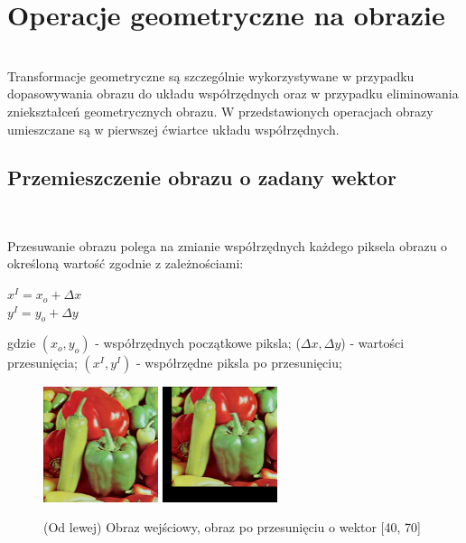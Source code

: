 \documentclass[final,a4paper,openany,12pt]{mwbk}
\begin{document}
\chapter{Operacje geometryczne na obrazie}
\hfill\\
\indent
Transformacje geometryczne są szczególnie wykorzystywane w przypadku dopasowywania obrazu do układu współrzędnych oraz w przypadku eliminowania zniekształceń geometrycznych obrazu. W przedstawionych operacjach obrazy umieszczane są w pierwszej ćwiartce układu współrzędnych.

\section{ Przemieszczenie obrazu o zadany wektor}
\hfill\\
\indent

Przesuwanie obrazu polega na zmianie współrzędnych każdego piksela obrazu o określoną wartość zgodnie z zależnościami:
	
	\begin{center}
		$x^I = x_{o} + \Delta x$\\
		$y^I = y_{o} + \Delta y$
	\end{center}
	
	gdzie $(x_{o},y_{o})$ - współrzędnych początkowe piksla; ($\Delta{x},\Delta{y}$) - wartości przesunięcia; $(x^I,y^I)$ - współrzędne piksla po przesunięciu;

\begin{figure}[H]
	\begin{center}
		\includegraphics[width=0.3\textwidth]{1/1Geo_Move_Original}
		\includegraphics[width=0.3\textwidth]{1/1Geo_Move_Result}
	\end{center}
	\caption{(Od lewej) Obraz wejściowy, obraz po przesunięciu o wektor [40, 70] }
\end{figure}
\end{document}
